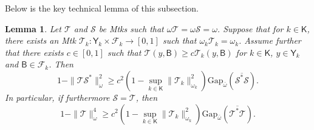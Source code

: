 \documentclass[12pt]{article}
\newcommand{\Y}{\mathsf{Y}}
\newcommand{\F}{\mathcal{F}}
\newcommand{\Mtk}{\mtkfont{T}}
\newcommand{\mtkfont}{\mathcal}
\newtheorem{lemma}[theorem]{Lemma}
\begin{document}
Below is the key technical lemma of this subsection. 

\begin{lemma} \label{lem:decomposition}
	Let $\Mtk $ and $\mtkfont{S}$ be Mtks such that $\omega \Mtk  = \omega \mtkfont{S} = \omega$.
	Suppose that for $k \in \mathsf{K}$, there exists an Mtk $\Mtk_k : \Y_k \times \F_k \to [0,1]$ such that $\omega_k \Mtk _k = \omega_k$.
	Assume further that there exists $c \in [0,1]$ such that $\Mtk (y,\mathsf{B}) \geq c \Mtk _k(y,\mathsf{B})$ for $k \in \mathsf{K}$, $y \in \Y_k$ and $\mathsf{B} \in \F_k$.
	Then
	\begin{equation} \label{ine:decomposition}
		1 - \|\Mtk \mtkfont{S}^*\|_{\omega}^2 \geq c^2 \left(1 - \sup_{k \in \mathsf{K}} \|\Mtk _k\|_{\omega_k}^2 \right) \mbox{Gap}_{\bar{\omega}} (\overline{\mtkfont{S}^*\mtkfont{S}} ).
	\end{equation}
	In particular, if furthermore $\mtkfont{S} = \Mtk$, then
	\[
	1 - \|\Mtk\|_{\omega}^4 \geq c^2 \left(1 - \sup_{k \in \mathsf{K}} \|\Mtk _k\|_{\omega_k}^2 \right) \mbox{Gap}_{\bar{\omega}} ( \overline{\mtkfont{\Mtk}^*\mtkfont{\Mtk}} ).
	\]
\end{lemma}
\end{document}
